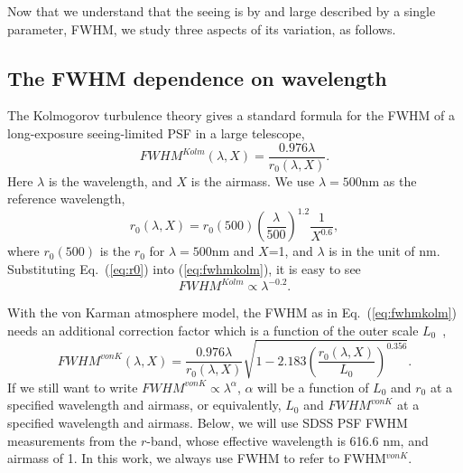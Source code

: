 

Now that we understand that the seeing is by and large described by 
a single parameter, FWHM, we study three aspects of its variation, as follows.


\subsection{The FWHM dependence on wavelength} 

The Kolmogorov turbulence theory gives a standard formula for the FWHM of a long-exposure
seeing-limited PSF in a large telescope,
\begin{equation}
FWHM^{Kolm}(\lambda, X) = \frac{0.976\lambda}{r_0(\lambda,X)}.
\label{eq:fwhmkolm}
\end{equation}
Here $\lambda$ is the wavelength, and $X$ is the airmass.
We use $\lambda = 500$nm as the reference wavelength,
\begin{equation}
r_0(\lambda,X) = r_0(500) \left(\frac{\lambda}{500}\right)^{1.2}
\frac{1}{X^{0.6}},
\label{eq:r0}
\end{equation}
where $r_0(500)$ is the $r_0$ for $\lambda=500$nm and $X$=1, and $\lambda$ is in
the unit of nm.
Substituting Eq.~(\ref{eq:r0}) into (\ref{eq:fwhmkolm}), it is easy to see
\begin{equation}
FWHM^{Kolm} \propto \lambda^{-0.2}.
\end{equation}


With the von Karman atmosphere model, the FWHM as in
Eq.~(\ref{eq:fwhmkolm}) needs an additional correction factor
which is a function of the outer scale $L_0$~\citep{Tokovinin2002},
\begin{equation}
FWHM^{vonK}(\lambda, X) = \frac{0.976\lambda}{r_0(\lambda,X)}
\sqrt{1-2.183\left( \frac{r_0(\lambda,X) }{L_0} \right)^{0.356}}.
\end{equation}
If we still want to write $FWHM^{vonK} \propto \lambda^{\alpha} $, 
$\alpha$ will be a function of $L_0$ and $r_0$ at a specified
wavelength and airmass, or equivalently, $L_0$ and $FWHM^{vonK}$ at a
specified wavelength and airmass. Below, we will use SDSS 
PSF FWHM measurements from the 
$r$-band,
whose effective wavelength is 616.6 nm, and airmass of 1.
In this work, we always use FWHM to refer to FWHM$^{vonK}$.

